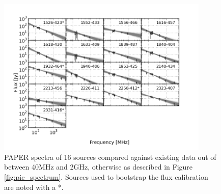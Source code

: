 \documentclass[preprint]{aastex}
\begin{document}
\begin{figure}[htbp]
\begin{center}
\includegraphics[width=0.9\textwidth]{plots/srcfig_3.png}
\caption{PAPER spectra of 16 sources compared against existing data out of  \cite{Vollmer:2010p6422} between 40MHz and 2GHz, otherwise as described in Figure \ref{fig:pic_spectrum}.\label{fig:srcs3} Sources used to bootstrap the flux calibration are noted with a *.}
\end{center}
\end{figure}
\end{document}
